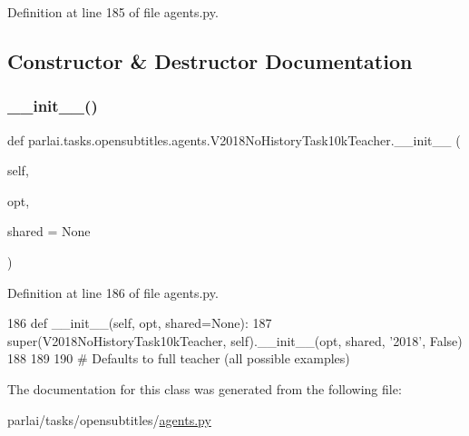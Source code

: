 Definition at line 185 of file agents.\+py.



\subsection{Constructor \& Destructor Documentation}
\mbox{\label{classparlai_1_1tasks_1_1opensubtitles_1_1agents_1_1V2018NoHistoryTask10kTeacher_ace3fc69c7a84c37416b3b50b86735169}} 
\subsubsection{\texorpdfstring{\+\_\+\+\_\+init\+\_\+\+\_\+()}{\_\_init\_\_()}}
{\footnotesize\ttfamily def parlai.\+tasks.\+opensubtitles.\+agents.\+V2018\+No\+History\+Task10k\+Teacher.\+\_\+\+\_\+init\+\_\+\+\_\+ (\begin{DoxyParamCaption}\item[{}]{self,  }\item[{}]{opt,  }\item[{}]{shared = {\ttfamily None} }\end{DoxyParamCaption})}



Definition at line 186 of file agents.\+py.


\begin{DoxyCode}
186     \textcolor{keyword}{def }\_\_init\_\_(self, opt, shared=None):
187         super(V2018NoHistoryTask10kTeacher, self).\_\_init\_\_(opt, shared, \textcolor{stringliteral}{'2018'}, \textcolor{keyword}{False})
188 
189 
190 \textcolor{comment}{# Defaults to full teacher (all possible examples)}
\end{DoxyCode}


The documentation for this class was generated from the following file\+:\begin{DoxyCompactItemize}
\item 
parlai/tasks/opensubtitles/\hyperlink{parlai_2tasks_2opensubtitles_2agents_8py}{agents.\+py}\end{DoxyCompactItemize}
